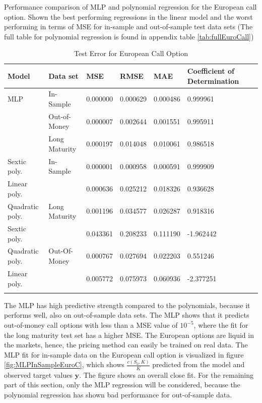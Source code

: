 \begin{table}[H]
\caption{Test Error for European Call Option}{Performance comparison of MLP and polynomial regression for the European call option. Shown the best performing regressions in the linear model and the worst performing in terms of MSE for in-sample and out-of-sample test data sets (The full table for polynomial regression is found in appendix table \ref{tab:fullEuroCall})}
\label{tab:ComparePolyWithMLP}
\centering
\begin{tabular}{l l l l l l l }
\toprule
\textbf{Model} & \textbf{Data set} & \textbf{MSE} & \textbf{RMSE} & \textbf{MAE} & \textbf{Coefficient of Determination} \\
\midrule
MLP & In-Sample & 0.000000 & 0.000629 & 0.000486 & 0.999961\\
& Out-of-Money & 0.000007 & 0.002644 & 0.001551 & 0.995911\\
& Long Maturity & 0.000197 & 0.014048 & 0.010061 & 0.986518\\
Sextic poly. & In-Sample & 0.000001 & 0.000958 & 0.000591 & 0.999909\\
Linear poly. &  & 0.000636 & 0.025212 & 0.018326 & 0.936628\\
Quadratic poly. & Long Maturity & 0.001196 & 0.034577 & 0.026287 & 0.918316\\
Sextic poly. &  & 0.043361 & 0.208233 & 0.111190 & -1.962442\\
Quadratic poly. & Out-Of-Money & 0.000767 & 0.027694 & 0.022203 & 0.551246\\
Linear poly. &  & 0.005772 & 0.075973 & 0.060936 & -2.377251\\
\bottomrule\\
\end{tabular}
\end{table}

The MLP has high predictive strength compared to the polynomials, because it performs well, also on out-of-sample data sets. The MLP shows that it predicts out-of-money call options with less than a MSE value of $10^{-5}$, where the fit for the long maturity test set has a higher MSE. The European options are liquid in the markets, hence, the pricing method can easily be trained on real data. The MLP fit for in-sample data on the European call option is visualized in figure \ref{fig:MLPInSampleEuroC}, which shows $\frac{c(S_0,K)}{K}$ predicted from the model and observed target values $\bm{y}$. The figure shows an overall close fit. For the remaining part of this section, only the MLP regression will be considered, because the polynomial regression has shown bad performance for out-of-sample data.


